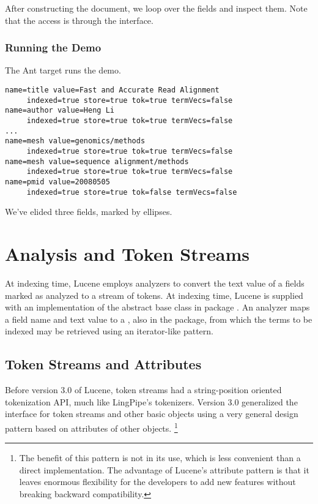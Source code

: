 After constructing the document, we loop over the fields and
inspect them.
%
%
Note that the access is through the  interface.

\subsubsection{Running the Demo}

The Ant target  runs the demo.  
%
\begin{verbatim}
name=title value=Fast and Accurate Read Alignment
     indexed=true store=true tok=true termVecs=false
name=author value=Heng Li
     indexed=true store=true tok=true termVecs=false
...
name=mesh value=genomics/methods
     indexed=true store=true tok=true termVecs=false
name=mesh value=sequence alignment/methods
     indexed=true store=true tok=true termVecs=false
name=pmid value=20080505
     indexed=true store=true tok=false termVecs=false
\end{verbatim}
%
We've elided three fields, marked by ellipses.



\section{Analysis and Token Streams}\label{section:lucene-analysis}

At indexing time, Lucene employs analyzers to convert the text value
of a fields marked as analyzed to a stream of tokens.  At indexing
time, Lucene is supplied with an implementation of the abstract base
class  in package .
An analyzer maps a field name and text value to a ,
also in the  package, from which the terms to be
indexed may be retrieved using an iterator-like pattern.

\subsection{Token Streams and Attributes}

Before version 3.0 of Lucene, token streams had a string-position
oriented tokenization API, much like LingPipe's tokenizers.  Version
3.0 generalized the interface for token streams and other basic
objects using a very general design pattern based on attributes of
other objects.
%
\footnote{The benefit of this pattern is not in its use, which is less
  convenient than a direct implementation.  The advantage of Lucene's
  attribute pattern is that it leaves enormous flexibility for the
  developers to add new features without breaking backward
  compatibility.}


